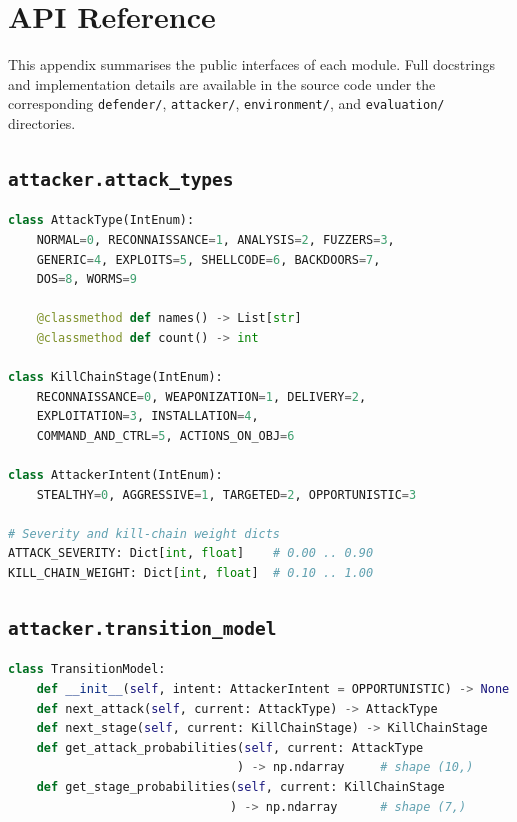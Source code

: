 \chapter{API Reference}
\label{app:api}

This appendix summarises the public interfaces of each module.
Full docstrings and implementation details are available in the source code
under the corresponding \texttt{defender/}, \texttt{attacker/},
\texttt{environment/}, and \texttt{evaluation/} directories.

\section{\texttt{attacker.attack\_types}}

\begin{lstlisting}[language=Python, caption={Attack type and kill chain enumerations.}]
class AttackType(IntEnum):
    NORMAL=0, RECONNAISSANCE=1, ANALYSIS=2, FUZZERS=3,
    GENERIC=4, EXPLOITS=5, SHELLCODE=6, BACKDOORS=7,
    DOS=8, WORMS=9

    @classmethod def names() -> List[str]
    @classmethod def count() -> int

class KillChainStage(IntEnum):
    RECONNAISSANCE=0, WEAPONIZATION=1, DELIVERY=2,
    EXPLOITATION=3, INSTALLATION=4,
    COMMAND_AND_CTRL=5, ACTIONS_ON_OBJ=6

class AttackerIntent(IntEnum):
    STEALTHY=0, AGGRESSIVE=1, TARGETED=2, OPPORTUNISTIC=3

# Severity and kill-chain weight dicts
ATTACK_SEVERITY: Dict[int, float]    # 0.00 .. 0.90
KILL_CHAIN_WEIGHT: Dict[int, float]  # 0.10 .. 1.00
\end{lstlisting}

\section{\texttt{attacker.transition\_model}}

\begin{lstlisting}[language=Python, caption={Markov transition model interface.}]
class TransitionModel:
    def __init__(self, intent: AttackerIntent = OPPORTUNISTIC) -> None
    def next_attack(self, current: AttackType) -> AttackType
    def next_stage(self, current: KillChainStage) -> KillChainStage
    def get_attack_probabilities(self, current: AttackType
                                ) -> np.ndarray     # shape (10,)
    def get_stage_probabilities(self, current: KillChainStage
                               ) -> np.ndarray      # shape (7,)
\end{lstlisting}

